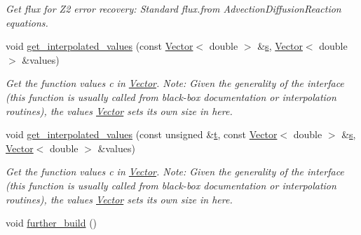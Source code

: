 \begin{DoxyCompactItemize}
\begin{DoxyCompactList}\small\item\em Get \textquotesingle{}flux\textquotesingle{} for Z2 error recovery\+: Standard flux.\+from Advection\+Diffusion\+Reaction equations. \end{DoxyCompactList}\item 
void \hyperlink{classoomph_1_1RefineableAdvectionDiffusionReactionEquations_ab68dd4feee2b6e4d268e464686254199}{get\+\_\+interpolated\+\_\+values} (const \hyperlink{classoomph_1_1Vector}{Vector}$<$ double $>$ \&\hyperlink{cfortran_8h_ab7123126e4885ef647dd9c6e3807a21c}{s}, \hyperlink{classoomph_1_1Vector}{Vector}$<$ double $>$ \&values)
\begin{DoxyCompactList}\small\item\em Get the function values c in \hyperlink{classoomph_1_1Vector}{Vector}. Note\+: Given the generality of the interface (this function is usually called from black-\/box documentation or interpolation routines), the values \hyperlink{classoomph_1_1Vector}{Vector} sets its own size in here. \end{DoxyCompactList}\item 
void \hyperlink{classoomph_1_1RefineableAdvectionDiffusionReactionEquations_aa73aae12983b44f1adb2ef19819abf19}{get\+\_\+interpolated\+\_\+values} (const unsigned \&\hyperlink{cfortran_8h_af6f0bd3dc13317f895c91323c25c2b8f}{t}, const \hyperlink{classoomph_1_1Vector}{Vector}$<$ double $>$ \&\hyperlink{cfortran_8h_ab7123126e4885ef647dd9c6e3807a21c}{s}, \hyperlink{classoomph_1_1Vector}{Vector}$<$ double $>$ \&values)
\begin{DoxyCompactList}\small\item\em Get the function values c in \hyperlink{classoomph_1_1Vector}{Vector}. Note\+: Given the generality of the interface (this function is usually called from black-\/box documentation or interpolation routines), the values \hyperlink{classoomph_1_1Vector}{Vector} sets its own size in here. \end{DoxyCompactList}\item 
void \hyperlink{classoomph_1_1RefineableAdvectionDiffusionReactionEquations_aed29fbe38b879562939f96c9403bad50}{further\+\_\+build} ()
\end{DoxyCompactItemize}
